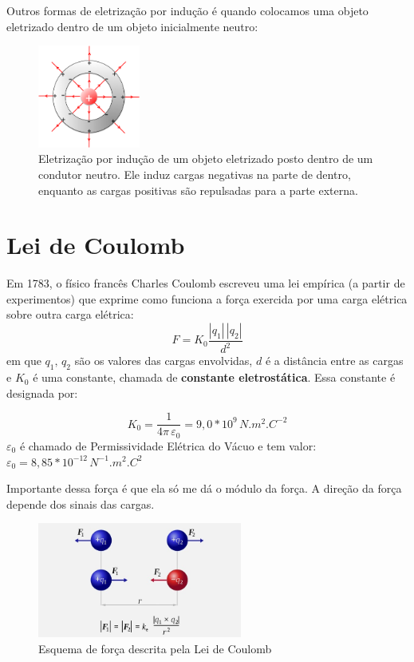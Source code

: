 \documentclass[12pt]{extarticle}
\newcommand{\<}{\langle}
\renewcommand{\>}{\rangle}
\theoremstyle{definition}
\begin{document}
Outros formas de eletrização por indução é quando colocamos uma objeto eletrizado dentro de um objeto inicialmente neutro: 
\begin{figure}[H]
    \centering
    \includegraphics[width=0.3\textwidth]{qnd3i.png}
    \caption{Eletrização por indução de um objeto eletrizado posto dentro de um condutor neutro. Ele induz cargas negativas na parte de dentro, enquanto as cargas positivas são repulsadas para a parte externa.}
    \label{fig:ex_7}
\end{figure}

\section{Lei de Coulomb}
Em 1783, o físico francês Charles Coulomb escreveu uma lei empírica (a partir de experimentos) que exprime como funciona a força exercida por uma carga elétrica sobre outra carga elétrica:
\begin{equation}
    F = K_0\frac{|q_1|\,|q_2|}{d^2}
\end{equation}
\noindent em que $q_1,\,q_2$ são os valores das cargas envolvidas, $d$ é a distância entre as cargas e $K_0$ é uma constante, chamada de \textbf{constante eletrostática}. Essa constante é designada por:

\begin{equation}
    K_0 = \frac{1}{4\pi\,\varepsilon_0} = 9,0*10^9\,N.m^2.C^{-2}
\end{equation}
\noindent $\varepsilon_0$ é chamado de Permissividade Elétrica do Vácuo e tem valor: $\varepsilon_0 = 8,85*10^{-12}\,N^{-1}.m^2.C^{2}$

Importante dessa força é que ela só me dá o módulo da força. A direção da força depende dos sinais das cargas.

\begin{figure}[H]
    \centering
    \includegraphics[width=0.6\textwidth]{atracaoerepulsaocargaseletricas-cke.jpg}
    \caption{Esquema de força descrita pela Lei de Coulomb}
    \label{fig:ex_8}
\end{figure}
\end{document}
